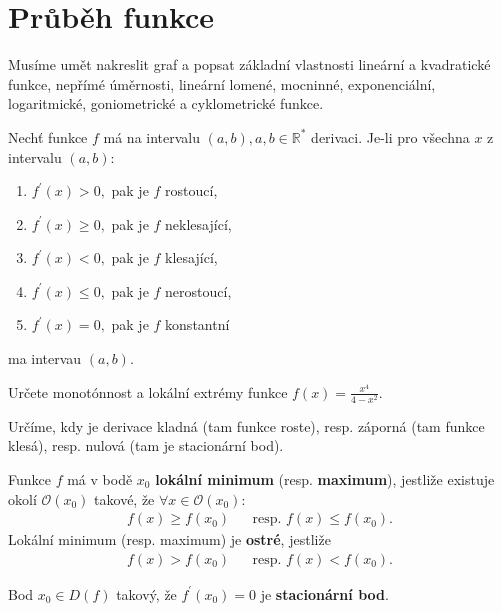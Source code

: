 \section{Průběh funkce}
\begin{pozn}
    Musíme umět nakreslit graf a popsat základní vlastnosti lineární a
    kvadratické funkce, nepřímé úměrnosti, lineární lomené, mocninné, exponenciální,
    logaritmické, goniometrické a cyklometrické funkce.
\end{pozn}

\begin{veta}
Nechť funkce $f$ má na intervalu $(a,b),a,b\in \mathbb R^*$ derivaci. Je-li pro
všechna $x$ z intervalu $(a,b)$:
\begin{enumerate}[$i.$]
\item $f^\prime(x)>0,$ pak je $f$ rostoucí,
\item $f^\prime(x)\geq 0,$ pak je $f$ neklesající,
\item $f^\prime(x)<0,$ pak je $f$ klesající,
\item $f^\prime(x) \leq 0,$ pak je $f$ nerostoucí,
\item $f^\prime(x)=0,$ pak je $f$ konstantní
\end{enumerate}
ma intervau $(a,b).$
\end{veta}

\begin{priklad}
Určete monotónnost a lokální extrémy funkce $f(x)=\frac{x^4}{4-x^2}$.
\end{priklad}

\begin{reseni}
Určíme, kdy je derivace kladná (tam funkce roste), resp. záporná (tam funkce klesá),
resp. nulová (tam je stacionární bod).
\end{reseni}

\begin{definition}
Funkce $f$ má v bodě $x_0$ \textbf{lokální minimum} (resp. \textbf{maximum}),
jestliže existuje okolí $\mathscr O(x_0)$ takové, že $\forall x \in \mathscr O(x_0):$
\begin{align*}
    f(x)\geq f(x_0) & & \textrm{resp. } f(x)\leq f(x_0).
\end{align*}
Lokální minimum (resp. maximum) je \textbf{ostré}, jestliže
\begin{align*}
    f(x)> f(x_0) & & \textrm{resp. } f(x)<f(x_0).
\end{align*}
\end{definition}

\begin{definition}
Bod $x_0\in D(f)$ takový, že $f^\prime(x_0)=0$ je \textbf{stacionární bod}.
\end{definition}

